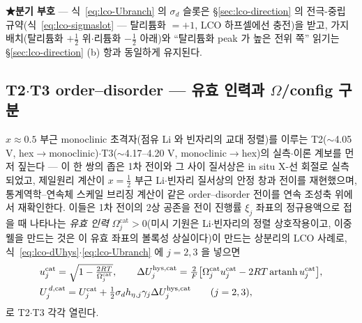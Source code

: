 \textbf{★분기 부호} --- 식~\eqref{eq:lco-Ubranch} 의 $\sigma_d$ 슬롯은 \S\ref{sec:lco-direction} 의 전극-중립
규약(식~\eqref{eq:lco-sigmaslot} --- 탈리튬화 $=+1$, LCO 하프셀에선 충전)을 받고, 가지 배치(탈리튬화
$+\tfrac12$ 위$\cdot$리튬화 $-\tfrac12$ 아래)와 ``탈리튬화 peak 가 높은 전위 쪽'' 읽기는 \S\ref{sec:lco-direction} (b)
항과 동일하게 유지된다.

\subsection{T2$\cdot$T3 order--disorder --- 유효 인력과 $\Omega$/config 구분}\label{sec:lco-hys-od}
$x\approx0.5$ 부근 monoclinic 초격자(점유 Li 와 빈자리의 교대 정렬)를 이루는 T2($\sim$4.05 V,
hex$\to$monoclinic)$\cdot$T3($\sim$4.17--4.20 V, monoclinic$\to$hex)의 실측$\cdot$이론 계보를 먼저
짚는다 --- 이 한 쌍의 좁은 1차 전이와 그 사이 질서상은 in situ X-선 회절로 실측되었고\cite{reimers1992},
제일원리 계산이 $x{=}\tfrac12$ 부근 Li$\cdot$빈자리 질서상의 안정 창과 전이를 재현했으며\cite{vanderven1998},
통계역학–연속체 스케일 브리징 계산이 같은 order--disorder 전이를 연속 조성축 위에서
재확인한다\cite{ml2024}. 이들은 1차 전이의 2상 공존을 전이
진행률 $\xi_j$ 좌표의 정규용액으로 접을 때 나타나는 \emph{유효 인력} $\Omega_j^\mathrm{cat}>0$(미시
기원은 Li$\cdot$빈자리의 정렬 상호작용이고, 이중웰을 만드는 것은 이 유효 좌표의 볼록성 상실이다)이
만드는 상분리의 LCO 사례로, 식~\eqref{eq:lco-dUhys}$\cdot$\eqref{eq:lco-Ubranch} 에 $j=2,3$ 을 넣으면
\[
\begin{aligned}
&u_j^\mathrm{cat}=\sqrt{1-\tfrac{2RT}{\Omega_j^\mathrm{cat}}},\qquad
\Delta U_j^{\mathrm{hys},\mathrm{cat}}=\tfrac{2}{F}\big[\Omega_j^\mathrm{cat}u_j^\mathrm{cat}
-2RT\,\mathrm{artanh}\,u_j^\mathrm{cat}\big],\\
&U_j^{\,d,\mathrm{cat}}=U_j^\mathrm{cat}+\tfrac12\sigma_d h_{\eta,j}\gamma_j\Delta U_j^{\mathrm{hys},\mathrm{cat}}
\qquad(j=2,3),
\end{aligned}
\]
로 T2$\cdot$T3 각각 열린다.

